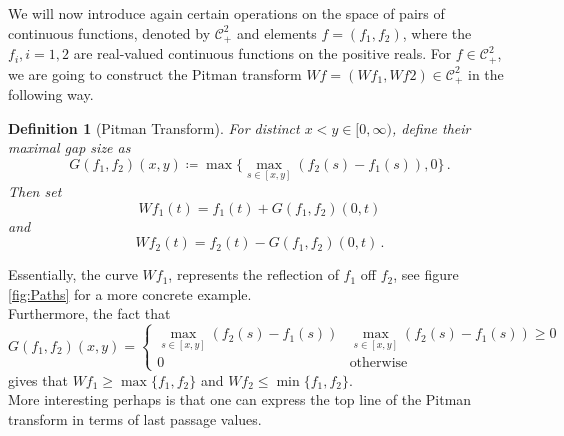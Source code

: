 \documentclass[12pt]{report}
\theoremstyle{plain}
\newtheorem{definition}{Definition}[section]
\begin{document}
\indent We will now introduce again certain operations on the space of pairs of continuous functions, denoted by \(\mathcal{C}^2_{+}\) and elements \(f = (f_1, f_2)\), where the \(f_i, i = 1,2\) are real-valued continuous functions on the positive reals. For \(f\in\mathcal{C}^2_{+}\), we are going to construct the Pitman transform \(Wf = (Wf_1, Wf2)\in \mathcal{C}^2_{+}\) in the following way. 

\begin{definition}[Pitman Transform]\label{Pitman}
    For distinct \(x<y\in [0,\infty )\), define their maximal gap size as
\[
G(f_1, f_2)(x,y) \coloneqq  \max\{\displaystyle \max_{s\in[x,y]}(f_2(s)-f_1(s)), 0 \}\,.
\]
Then set
\[
Wf_1(t) = f_1(t)+G(f_1, f_2)(0,t) 
\]
and
\[
Wf_2(t) = f_2(t)-G(f_1, f_2)(0,t)\,.
\]
\end{definition}

Essentially, the curve \(Wf_1\), represents the reflection of \(f_1\) off \(f_2\), see figure \ref{fig:Paths} for a more concrete example.\\

Furthermore, the fact that 
\[G(f_1, f_2)(x,y) = 
\begin{cases} 
  \displaystyle \max_{s\in[x,y]}(f_2(s)-f_1(s)) & \displaystyle \max_{s\in[x,y]}(f_2(s)-f_1(s))\geq 0 \\
  0 & \text{otherwise}
\end{cases}\] 
gives that \(Wf_1\geq \max\{f_1, f_2\}\) and  \(Wf_2\leq \min\{f_1, f_2\}\).\\

More interesting perhaps is that one can express the top line of the Pitman transform in terms of last passage values. 
\end{document}
